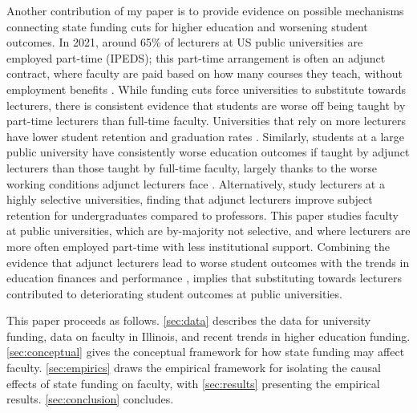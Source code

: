 Another contribution of my paper is to provide evidence on possible mechanisms connecting state funding cuts for higher education and worsening student outcomes.
In 2021, around 65\% of lecturers at US public universities are employed part-time (IPEDS); this part-time arrangement is often an adjunct contract, where faculty are paid based on how many courses they teach, without employment benefits \citep{aau2014characteristics}.
While funding cuts force universities to substitute towards lecturers, there is consistent evidence that students are worse off being taught by part-time lecturers than full-time faculty.
Universities that rely on more lecturers have lower student retention and graduation rates \citep{jaeger2011examining,ehrenberg2005tenured}.
Similarly, students at a large public university have consistently worse education outcomes if taught by adjunct lecturers than those taught by full-time faculty, largely thanks to the worse working conditions adjunct lecturers face \citep{zhu2021limited}.
Alternatively, \cite{bettinger2010does,figlio2015tenure} study lecturers at a highly selective universities, finding that adjunct lecturers improve subject retention for undergraduates compared to professors.
This paper studies faculty at public universities, which are by-majority not selective, and where lecturers are more often employed part-time with less institutional support.
Combining the evidence that adjunct lecturers lead to worse student outcomes with the trends in education finances and performance \citep{NBERw23736,NBERw27885}, implies that substituting towards lecturers contributed to deteriorating student outcomes at public universities.

This paper proceeds as follows.
\autoref{sec:data} describes the data for university funding, data on faculty in Illinois, and recent trends in higher education funding.
\autoref{sec:conceptual} gives the conceptual framework for how state funding may affect faculty.
\autoref{sec:empirics} draws the empirical framework for isolating the causal effects of state funding on faculty, with \autoref{sec:results} presenting the empirical results.
\autoref{sec:conclusion} concludes.
